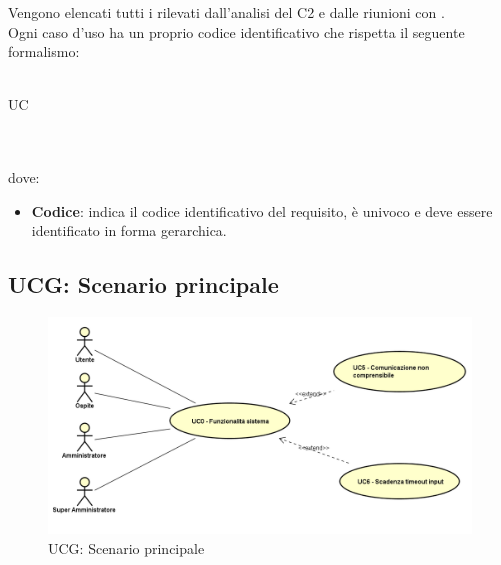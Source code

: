 \documentclass[AdR.tex]{subfiles}
\begin{document}
Vengono elencati tutti i  rilevati dall'analisi del  C2 e dalle riunioni con \PROPONENTE. \\
Ogni caso d'uso ha un proprio codice identificativo  che rispetta il seguente formalismo:\\ \\
\centerline{UC\textbraceright{}}
\\ \\dove:
\begin{itemize}
	\item \textbf{Codice}: indica il codice identificativo del requisito, è univoco e deve essere identificato in forma gerarchica.
\end{itemize}


\newpage
\subsection{UCG: Scenario principale}
\label{UCG}
\begin{figure}[h]
\centering
\includegraphics[width=\textwidth,height=\textheight,keepaspectratio]{images/UseCaseUCG.png}
\caption{UCG: Scenario principale}
\end{figure}
\end{document}

